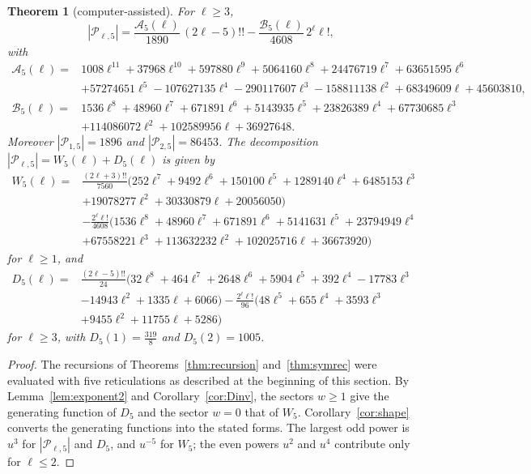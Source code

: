 \documentclass[11pt,a4paper]{article}
\newtheorem{theorem}{Theorem}[section]
\theoremstyle{definition}
\newcommand{\cP}{\mathcal{P}}
\begin{document}
\begin{theorem}[computer-assisted]\label{thm:k5}
For $\ell\ge3$,
\[
|\cP_{\ell,5}|=\frac{\mathcal A_5(\ell)}{1890}\,(2\ell-5)!!-\frac{\mathcal B_5(\ell)}{4608}\,2^\ell\ell!,
\]
with
\begin{align*}
\mathcal A_5(\ell)={}&1008\ell^{11}+37968\ell^{10}+597880\ell^9+5064160\ell^8+24476719\ell^7+63651595\ell^6\\
&+57274651\ell^5-107627135\ell^4-290117607\ell^3-158811138\ell^2+68349609\ell+45603810,\\
\mathcal B_5(\ell)={}&1536\ell^8+48960\ell^7+671891\ell^6+5143935\ell^5+23826389\ell^4+67730685\ell^3\\
&+114086072\ell^2+102589956\ell+36927648 .
\end{align*}
Moreover $|\cP_{1,5}|=1896$ and $|\cP_{2,5}|=86453$. The decomposition $|\cP_{\ell,5}|=W_5(\ell)+D_5(\ell)$ is given by
\begin{align*}
W_5(\ell)={}&\frac{(2\ell+3)!!}{7560}\bigl(252\ell^7+9492\ell^6+150100\ell^5+1289140\ell^4+6485153\ell^3\\
&+19078277\ell^2+30330879\ell+20056050\bigr)\\
&-\frac{2^\ell\ell!}{4608}\bigl(1536\ell^8+48960\ell^7+671891\ell^6+5141631\ell^5+23794949\ell^4\\
&+67558221\ell^3+113632232\ell^2+102025716\ell+36673920\bigr)
\end{align*}
for $\ell\ge1$, and
\begin{align*}
D_5(\ell)={}&\frac{(2\ell-5)!!}{24}\bigl(32\ell^8+464\ell^7+2648\ell^6+5904\ell^5+392\ell^4-17783\ell^3\\
&-14943\ell^2+1335\ell+6066\bigr)-\frac{2^\ell\ell!}{96}\bigl(48\ell^5+655\ell^4+3593\ell^3\\
&+9455\ell^2+11755\ell+5286\bigr)
\end{align*}
for $\ell\ge3$, with $D_5(1)=\frac{319}{8}$ and $D_5(2)=1005$.
\end{theorem}

\begin{proof}
The recursions of Theorems~\ref{thm:recursion} and~\ref{thm:symrec} were evaluated with five reticulations as described at the beginning of this section. By Lemma~\ref{lem:exponent2} and Corollary~\ref{cor:Dinv}, the sectors $w\ge1$ give the generating function of $D_5$ and the sector $w=0$ that of $W_5$. Corollary~\ref{cor:shape} converts the generating functions into the stated forms. The largest odd power is $u^{3}$ for $|\cP_{\ell,5}|$ and $D_5$, and $u^{-5}$ for $W_5$; the even powers $u^{2}$ and $u^{4}$ contribute only for $\ell\le2$.
\end{proof}
\end{document}

